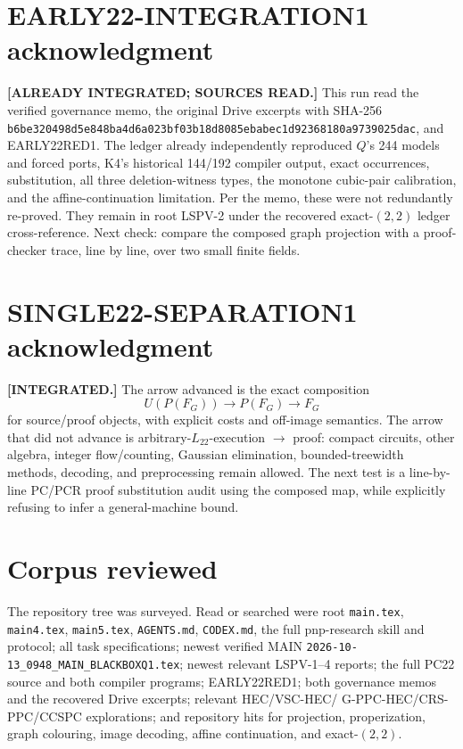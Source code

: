 \documentclass[11pt]{article}
\newcommand{\status}[1]{\textbf{[#1]}}
\begin{document}
\section{EARLY22-INTEGRATION1 acknowledgment}
\status{ALREADY INTEGRATED; SOURCES READ.}  This run read the verified governance
memo, the original Drive excerpts with SHA-256
\texttt{b6be320498d5e848ba4d6a023bf03b18d8085ebabec1d92368180a9739025dac},
and EARLY22RED1.  The ledger already independently reproduced $Q$'s 244 models
and forced ports, K4's historical 144/192 compiler output, exact occurrences,
substitution, all three deletion-witness types, the monotone cubic-pair
calibration, and the affine-continuation limitation.  Per the memo, these were
not redundantly re-proved.  They remain in root LSPV-2 under the recovered
exact-$(2,2)$ ledger cross-reference.  Next check: compare the composed graph
projection with a proof-checker trace, line by line, over two small finite fields.

\section{SINGLE22-SEPARATION1 acknowledgment}
\status{INTEGRATED.}  The arrow advanced is the exact composition
\[
U(P(F_G))\longrightarrow P(F_G)\longrightarrow F_G
\]
for source/proof objects, with explicit costs and off-image semantics.  The
arrow that did not advance is arbitrary-$L_{22}$-execution $\to$ proof:
compact circuits, other algebra, integer flow/counting, Gaussian elimination,
bounded-treewidth methods, decoding, and preprocessing remain allowed.
The next test is a line-by-line PC/PCR proof substitution audit using the
composed map, while explicitly refusing to infer a general-machine bound.

\section{Corpus reviewed}
The repository tree was surveyed.  Read or searched were root
\texttt{main.tex}, \texttt{main4.tex}, \texttt{main5.tex},
\texttt{AGENTS.md}, \texttt{CODEX.md}, the full pnp-research skill and protocol;
all task specifications; newest verified MAIN
\texttt{2026-10-13\_0948\_MAIN\_BLACKBOXQ1.tex}; newest relevant LSPV-1--4
reports; the full PC22 source and both compiler programs; EARLY22RED1; both
governance memos and the recovered Drive excerpts; relevant HEC/VSC-HEC/
G-PPC-HEC/CRS-PPC/CCSPC explorations; and repository hits for projection,
properization, graph colouring, image decoding, affine continuation, and
exact-$(2,2)$.
\end{document}
